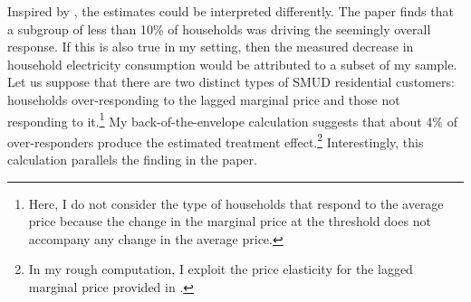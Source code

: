 Inspired by \cite{Misunderstanding-Nonlinear-Prices_2020_(Shaffer)}, the estimates could be interpreted differently. The paper finds that a subgroup of less than 10\% of households was driving the seemingly overall response. If this is also true in my setting, then the measured decrease in household electricity consumption would be attributed to a subset of my sample. Let us suppose that there are two distinct types of SMUD residential customers: households over-responding to the lagged marginal price and those not responding to it.\footnote{Here, I do not consider the type of households that respond to the average price because the change in the marginal price at the threshold does not accompany any change in the average price.} My back-of-the-envelope calculation suggests that about 4\% of over-responders produce the estimated treatment effect.\footnote{In my rough computation, I exploit the price elasticity for the lagged marginal price provided in \cite{Do-Consumers-Respond-to-Marginal-or-Average-Price?-Evidence-from-Nonlinear-Electricity-Pricing_2014_(Ito)}.} Interestingly, this calculation parallels the finding in the paper. 

